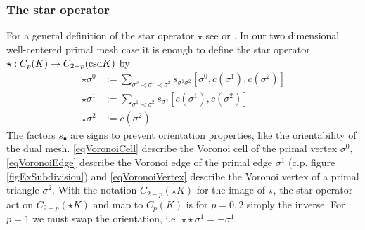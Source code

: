     \subsubsection{The star operator}
      For a general definition of the star operator \( \star \) see \cite{hirani,desbrun} or \cite[Ch. 7]{siggraphKap7}.
      In our two dimensional well-centered primal mesh case it is enough to define the star operator 
      \( \star: C_{p}(K) \rightarrow C_{2-p}(\text{csd} K) \)
      by 
      \begin{align}
        \label{eqVoronoiCell}
       \star\sigma^{0} &:= \sum_{\sigma^{0} \prec \sigma^{1} \prec \sigma^{2}}
                                                   s_{\sigma^{1} \sigma^{2}} \left[ \sigma^{0}, c(\sigma^{1}), c(\sigma^{2}) \right] \\
       \label{eqVoronoiEdge}
       \star\sigma^{1} &:= \sum_{\sigma^{1} \prec \sigma^{2}}
                                                   s_{\sigma^{2}} \left[ c(\sigma^{1}), c(\sigma^{2}) \right] \\
       \label{eqVoronoiVertex}
       \star\sigma^{2} &:= c(\sigma^{2}) 
      \end{align}
      The factors \( s_{\bullet} \) are signs to prevent orientation properties, like the orientability of the dual mesh.
      \eqref{eqVoronoiCell} describe the Voronoi cell of the primal vertex \( \sigma^{0} \),
      \eqref{eqVoronoiEdge} describe the Voronoi edge of the primal edge \( \sigma^{1} \) (c.p. figure \ref{figExSubdivision})
      and \eqref{eqVoronoiVertex} describe the Voronoi vertex of a primal triangle \( \sigma^{2} \). 
      With the notation \(C_{2-p}( \star K)  \) for the image of \( \star \), 
      the star operator act on \(C_{2-p}( \star K)  \) and map to \( C_{p}(K) \) is for \( p=0,2 \) simply the inverse.
      For \( p=1 \) we must swap the orientation, i.e. \( \star\star\sigma^{1}=-\sigma^{1} \).

